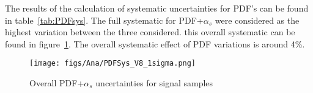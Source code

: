 The results of the calculation of systematic uncertainties for PDF's can be found in table~\ref{tab:PDFsys}. The full systematic for PDF+$\alpha_{s}$ were considered as the highest variation between the three considered. this overall systematic can be found in figure~\ref{fig:TotalPDFSys}. The overall systematic effect of PDF variations is around 4\%.

\begin{table*}[htbH]
\begin{center}
\caption{PDF+$\alpha_{s}$ uncertainties for signal samples\label{tab:PDFsys}}
\end{center}
\end{table*}

\begin{figure}[!Hhtbp]
  \begin{center}
    \texttt{[image: figs/Ana/PDFSys\_V8\_1sigma.png]}
    \caption{Overall PDF+$\alpha_{s}$ uncertainties for signal samples}
    \label{fig:TotalPDFSys}
  \end{center}
\end{figure}

